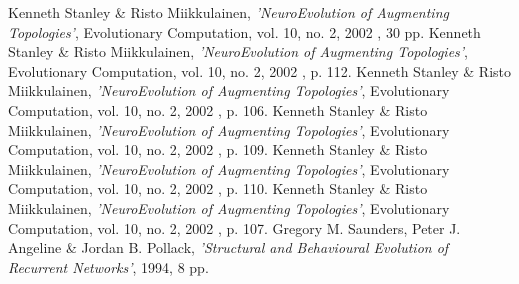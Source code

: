 \documentclass[]{Learning-to-Play-Wolfenstein-thesis}
\begin{document}
\newpage
\begin{thebibliography}{99}
 Kenneth Stanley \& Risto Miikkulainen, \emph{'NeuroEvolution of Augmenting Topologies'}, Evolutionary Computation, vol. 10, no. 2, 2002 , 30 pp.
 Kenneth Stanley \& Risto Miikkulainen, \emph{'NeuroEvolution of Augmenting Topologies'}, Evolutionary Computation, vol. 10, no. 2, 2002 , p. 112.
Kenneth Stanley \& Risto Miikkulainen, \emph{'NeuroEvolution of Augmenting Topologies'}, Evolutionary Computation, vol. 10, no. 2, 2002 , p. 106.
 Kenneth Stanley \& Risto Miikkulainen, \emph{'NeuroEvolution of Augmenting Topologies'}, Evolutionary Computation, vol. 10, no. 2, 2002 , p. 109.
 Kenneth Stanley \& Risto Miikkulainen, \emph{'NeuroEvolution of Augmenting Topologies'}, Evolutionary Computation, vol. 10, no. 2, 2002 , p. 110.
 Kenneth Stanley \& Risto Miikkulainen, \emph{'NeuroEvolution of Augmenting Topologies'}, Evolutionary Computation, vol. 10, no. 2, 2002 , p. 107.
 Gregory M. Saunders, Peter J. Angeline \& Jordan B. Pollack, \emph{'Structural and Behavioural Evolution of Recurrent Networks'}, 1994, 8 pp. 
\end{thebibliography}
\label{endpage}
\end{document}
